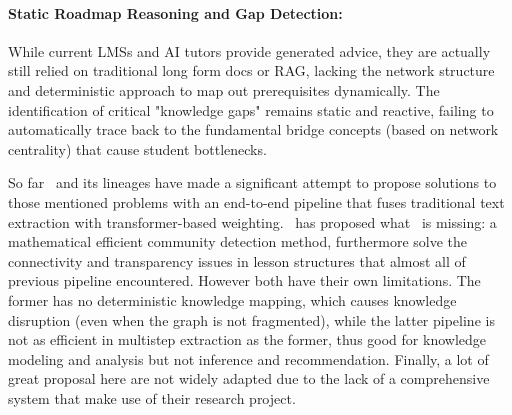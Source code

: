 \paragraph*{{Static Roadmap Reasoning and Gap Detection:}} While current LMSs and AI tutors provide generated advice, they are actually still relied on traditional long 
form docs or RAG, lacking the network structure and deterministic approach to map out prerequisites dynamically. The identification of critical "knowledge gaps" remains 
static and reactive, failing to automatically trace back to the fundamental bridge concepts (based on network centrality) that cause student bottlenecks.

So far~\cite{EduKGPipe} and its lineages have made a significant attempt to propose solutions to those mentioned problems with an 
end-to-end pipeline that fuses traditional text extraction with transformer-based weighting.~\cite{DKG} has proposed what~\cite{EduKGPipe} is missing: a mathematical 
efficient community detection method, furthermore solve the connectivity and transparency issues in lesson structures that almost all of previous pipeline encountered. 
However both have their own limitations. The former has no deterministic knowledge mapping, which causes knowledge disruption (even when the graph is not fragmented), 
while the latter pipeline is not as efficient in multistep extraction as the former, thus good for knowledge modeling and analysis but not inference and recommendation. 
Finally, a lot of great proposal here are not widely adapted due to the lack of a comprehensive system that make use of their research project. 

